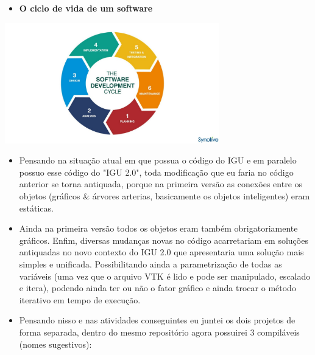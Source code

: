 \documentclass[10pt]{beamer}
\theoremstyle{remark}
\theoremstyle{definition}
\begin{document}
\begin{frame}[allowframebreaks]
\begin{itemize}
	\end{itemize}
	
	
	\framebreak
	
	\begin{itemize}
		\item \textbf{O ciclo de vida de um software}
		
	\end{itemize}
	
	\begin{center}
		\includegraphics[width=0.7\textwidth]{images/05.jpg}
	\end{center}
	
	
	\framebreak
	
	\begin{itemize}
	
		\item Pensando na situação atual em que possua o código do IGU e em paralelo possuo esse código do "IGU 2.0", toda modificação que eu faria no código anterior se torna antiquada, porque na primeira versão as conexões entre os objetos (gráficos & árvores arterias, basicamente os objetos inteligentes) eram estáticas.
		
		\item Ainda na primeira versão todos os objetos eram também obrigatoriamente gráficos. Enfim, diversas mudanças novas no código acarretariam em soluções antiquadas no novo contexto do IGU 2.0 que apresentaria uma solução mais simples e unificada. Possibilitando ainda a parametrização de todas as variáveis (uma vez que o arquivo VTK é lido e pode ser manipulado, escalado e itera), podendo ainda ter ou não o fator gráfico e ainda trocar o método iterativo em tempo de execução.
		
	\end{itemize}
	
	
	\framebreak
	
	\begin{itemize}
		\item Pensando nisso e nas atividades conseguintes eu juntei os dois projetos de forma separada, dentro do mesmo repositório agora possuirei 3 compiláveis (nomes sugestivos):
		

\end{itemize}
\end{frame}
\end{document}
